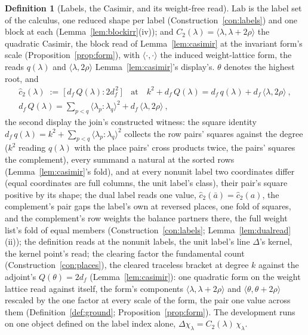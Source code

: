 \documentclass[11pt]{article}
\theoremstyle{definition}
\newtheorem{definition}{Definition}
\begin{document}
\begin{definition}[Labels, the Casimir, and its weight-free read]\label{def:c2hat}
$\mathrm{Lab}$ is the label set of the calculus, one reduced shape per
label (Construction~\ref{con:labels}) and one block at each
(Lemma~\ref{lem:blockirr}(iv)); and
$C_2(\lambda)=\langle\lambda,\lambda+2\rho\rangle$ the quadratic Casimir,
the block read of Lemma~\ref{lem:casimir} at the invariant form's scale
(Proposition~\ref{prop:form}), with $\langle\cdot,\cdot\rangle$ the induced
weight-lattice form, the reads $q(\lambda)$ and
$\langle\lambda,2\rho\rangle$ Lemma~\ref{lem:casimir}'s display's. $\theta$ denotes the highest root, and
\begin{gather*}
\hat c_2(\lambda)\;:=\;\big[\,d_f\,Q(\lambda):2d_f^{\,2}\,\big]
\quad\text{at}\quad
k^2+d_f\,Q(\lambda)=d_f\,q(\lambda)+d_f\,\langle\lambda,2\rho\rangle\ ,\\
d_f\,Q(\lambda)=\sum_{p<q}\langle\lambda_p\!:\!\lambda_q\rangle^2
+d_f\,\langle\lambda,2\rho\rangle\ ,
\end{gather*}
the second display the join's constructed witness: the square
identity
$d_f\,q(\lambda)=k^2+\sum_{p<q}\langle\lambda_p\!:\!\lambda_q\rangle^2$
collects the row pairs' squares against the degree ($k^2$ reading
$q(\lambda)$ with the place pairs' cross products twice, the pairs'
squares the complement), every summand a natural at the sorted rows
(Lemma~\ref{lem:casimir}'s fold), and at every nonunit label two
coordinates differ (equal coordinates are full columns, the unit
label's class), their pair's square positive by its shape; the
dual label reads one value, $\hat c_2(\bar a)=\hat c_2(a)$, the
complement's pair gaps the label's own at reversed places, one
fold of squares, and the complement's row weights the
balance partners there, the full weight list's fold of equal members
(Construction~\ref{con:labels}; Lemma~\ref{lem:dualread}(ii)); the
definition reads at the nonunit labels, the unit label's line
$\Delta$'s kernel, the kernel point's read; the clearing factor the
fundamental count (Construction~\ref{con:places}),
the cleared traceless bracket at degree $k$ against the adjoint's
$Q(\theta)=2d_f$ (Lemma~\ref{lem:casimir}): one quadratic form on the weight lattice read against itself,
the form's components $\langle\lambda,\lambda+2\rho\rangle$ and
$\langle\theta,\theta+2\rho\rangle$ rescaled by the one factor at every
scale of the form, the pair one value across them
(Definition~\ref{def:ground}; Proposition~\ref{prop:form}). The development runs on one
object defined on the label index alone,
$\Delta\chi_\lambda=C_2(\lambda)\,\chi_\lambda$.
\end{definition}
\end{document}
